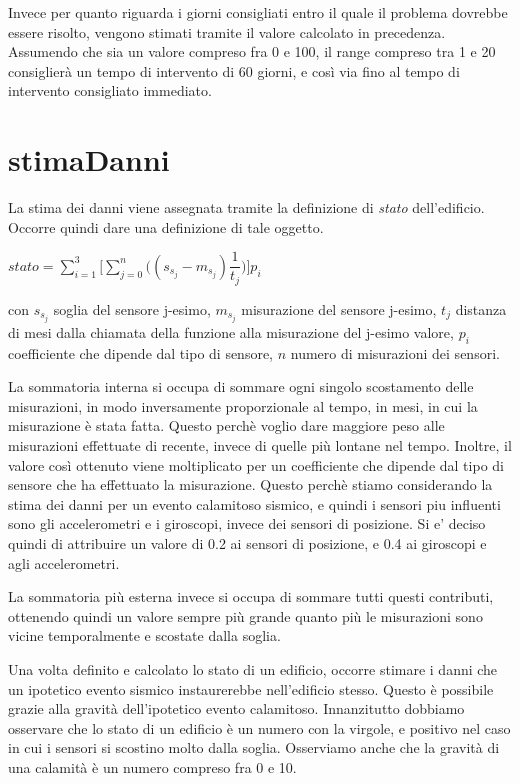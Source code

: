 \documentclass[12pt,a4paper]{report}
\begin{document}
                Invece per quanto riguarda i giorni consigliati entro il quale il problema dovrebbe essere risolto, vengono stimati tramite il valore calcolato in precedenza. Assumendo che sia un valore compreso fra 0 e 100, il range compreso tra 1 e 20 consiglierà un tempo di intervento di 60 giorni, e così via fino al tempo di intervento consigliato immediato.
                \section{stimaDanni}
                La stima dei danni viene assegnata tramite la definizione di \emph{stato} dell'edificio. Occorre quindi dare una definizione di tale oggetto.

                \begin{center}
                    $\displaystyle stato = \sum_{i=1}^{3} \Big[ \sum_{j=0}^{n} \Big( ( s_{s_{j}} - m_{s_{j}} ) \dfrac{1}{t_j} \Big) \Big] p_i$
                \end{center}
                con $s_{s_{j}}$ soglia del sensore j-esimo, $m_{s_{j}}$ misurazione del sensore j-esimo, $t_j$ distanza di mesi dalla chiamata della funzione alla misurazione del j-esimo valore, $p_i$ coefficiente che dipende dal tipo di sensore, $n$ numero di misurazioni dei sensori.

                La sommatoria interna si occupa di sommare ogni singolo scostamento delle misurazioni, in modo inversamente proporzionale al tempo, in mesi, in cui la misurazione è stata fatta. Questo perchè voglio dare maggiore peso alle misurazioni effettuate di recente, invece di quelle più lontane nel tempo. Inoltre, il valore così ottenuto viene moltiplicato per un coefficiente che dipende dal tipo di sensore che ha effettuato la misurazione. Questo perchè stiamo considerando la stima dei danni per un evento calamitoso sismico, e quindi i sensori piu influenti sono gli accelerometri e i giroscopi, invece dei sensori di posizione. Si e' deciso quindi di attribuire un valore di 0.2 ai sensori di posizione, e 0.4 ai giroscopi e agli accelerometri.

                La sommatoria più esterna invece si occupa di sommare tutti questi contributi, ottenendo quindi un valore sempre più grande quanto più le misurazioni sono vicine temporalmente e scostate dalla soglia.

                Una volta definito e calcolato lo stato di un edificio, occorre stimare i danni che un ipotetico evento sismico instaurerebbe nell'edificio stesso. Questo è possibile grazie alla gravità dell'ipotetico evento calamitoso. Innanzitutto dobbiamo osservare che lo stato di un edificio è un numero con la virgole, e positivo nel caso in cui i sensori si scostino molto dalla soglia. Osserviamo anche che la gravità di una calamità è un numero compreso fra 0 e 10.
                
\end{document}
